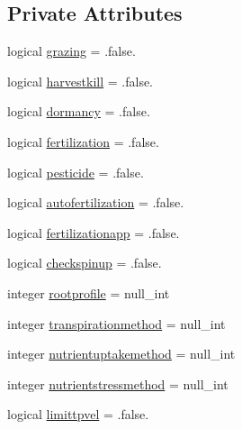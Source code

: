 \subsection*{Private Attributes}
\begin{DoxyCompactItemize}
\item 
logical \mbox{\hyperlink{structmodulevegetation_1_1t__computeoptions_a1396a40cd3ac8547bc62940f1ac41760}{grazing}} = .false.
\item 
logical \mbox{\hyperlink{structmodulevegetation_1_1t__computeoptions_a578b9d49a878ccef2c672397f29fc410}{harvestkill}} = .false.
\item 
logical \mbox{\hyperlink{structmodulevegetation_1_1t__computeoptions_a99b757e4ecee2ec8336a89294c7e18b2}{dormancy}} = .false.
\item 
logical \mbox{\hyperlink{structmodulevegetation_1_1t__computeoptions_a58da73643aeb6d2d96ae9bf5912986f0}{fertilization}} = .false.
\item 
logical \mbox{\hyperlink{structmodulevegetation_1_1t__computeoptions_a84404a914b1ddb8362f85f4cfccd43ee}{pesticide}} = .false.
\item 
logical \mbox{\hyperlink{structmodulevegetation_1_1t__computeoptions_ae8a0edee4f842a65cad153fa788aada1}{autofertilization}} = .false.
\item 
logical \mbox{\hyperlink{structmodulevegetation_1_1t__computeoptions_ab110021f4880306babc965fe41632b48}{fertilizationapp}} = .false.
\item 
logical \mbox{\hyperlink{structmodulevegetation_1_1t__computeoptions_a94edd40495cee40d471d64024693ccbe}{checkspinup}} = .false.
\item 
integer \mbox{\hyperlink{structmodulevegetation_1_1t__computeoptions_adc2743b31726e213d56c3439b08a0b37}{rootprofile}} = null\+\_\+int
\item 
integer \mbox{\hyperlink{structmodulevegetation_1_1t__computeoptions_a9f6ece32c96d3d2f894c913a3435eee5}{transpirationmethod}} = null\+\_\+int
\item 
integer \mbox{\hyperlink{structmodulevegetation_1_1t__computeoptions_ada81138e82034bf428754749b9c1ef5c}{nutrientuptakemethod}} = null\+\_\+int
\item 
integer \mbox{\hyperlink{structmodulevegetation_1_1t__computeoptions_a4e9afc4270f18667727e24aaad19ce17}{nutrientstressmethod}} = null\+\_\+int
\item 
logical \mbox{\hyperlink{structmodulevegetation_1_1t__computeoptions_ae6a29f8cd586423a1aa767d89fb07223}{limittpvel}} = .false.
\item 

\end{DoxyCompactItemize}
